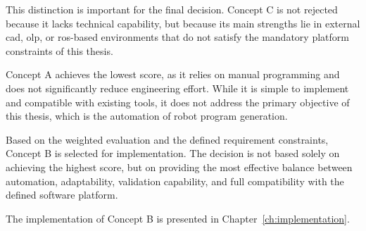 This distinction is important for the final decision. Concept C is not rejected because it lacks technical capability, but because its main strengths lie in external \acs{cad}, \acs{olp}, or \acs{ros}-based environments that do not satisfy the mandatory platform constraints of this thesis.

Concept A achieves the lowest score, as it relies on manual programming and does not significantly reduce engineering effort. While it is simple to implement and compatible with existing tools, it does not address the primary objective of this thesis, which is the automation of robot program generation.

Based on the weighted evaluation and the defined requirement constraints, Concept B is selected for implementation. The decision is not based solely on achieving the highest score, but on providing the most effective balance between automation, adaptability, validation capability, and full compatibility with the defined software platform.

The implementation of Concept B is presented in Chapter~\ref{ch:implementation}.
